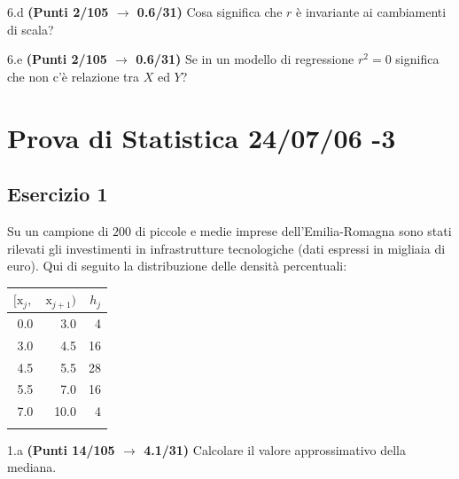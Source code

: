 \documentclass[
  11pt,
]{book}
\theoremstyle{mytheoremstyle}
\theoremstyle{mydefstyle}
\begin{document}
6.d \textbf{(Punti 2/105 \(\rightarrow\) 0.6/31)} Cosa significa che \(r\) è invariante ai cambiamenti di scala?

6.e \textbf{(Punti 2/105 \(\rightarrow\) 0.6/31)} Se in un modello di regressione \(r^2=0\) significa che non c'è relazione tra \(X\) ed \(Y\)?

\section{Prova di Statistica 24/07/06 -3}\label{prova-di-statistica-240706--3}

\subsection{Esercizio 1}\label{esercizio-1-42}

Su un campione di \(200\) di piccole e medie imprese dell'Emilia-Romagna sono stati rilevati gli investimenti in infrastrutture tecnologiche (dati espressi in migliaia di euro). Qui di seguito la distribuzione delle densità percentuali:

\begin{table}[H]
\centering
\begin{tabular}{rrr}
\toprule
$[\text{x}_j,$ & $\text{x}_{j+1})$ & $h_j$\\
\midrule
0.0 & 3.0 & 4\\
3.0 & 4.5 & 16\\
4.5 & 5.5 & 28\\
5.5 & 7.0 & 16\\
7.0 & 10.0 & 4\\
 &  & \\
\bottomrule
\end{tabular}
\end{table}

1.a \textbf{(Punti 14/105 \(\rightarrow\) 4.1/31)} Calcolare il valore approssimativo della mediana.
\end{document}
